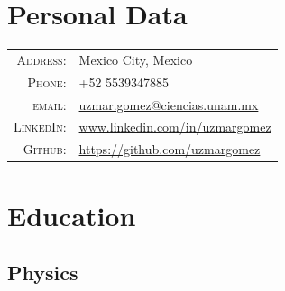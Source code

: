 \documentclass[a4paper,10pt]{article} %
\begin{document}
\section{Personal Data}
\bigskip
\begin{tabular}{rl}
\textsc{Address:} & Mexico City, Mexico \\
\textsc{Phone:} & +52 5539347885\\
\textsc{email:} & \href{mailto:uzmar.gomez@ciencias.unam.mx}{uzmar.gomez@ciencias.unam.mx}\\
\textsc{LinkedIn:} & \href{www.linkedin.com}{www.linkedin.com/in/uzmargomez}\\
\textsc{Github:} & \href{https://github.com/uzmargomez}{https://github.com/uzmargomez}%
\end{tabular}


\section{Education}
\bigskip
\subsection*{Physics}
\end{document}
